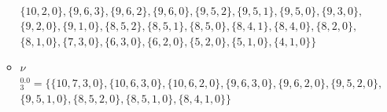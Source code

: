 \documentclass[12pt, a4paper, twoside]{book}
\numberwithin{equation}{section}
\theoremstyle{definition}
\newenvironment{ejem}
  {\pushQED{\qed}\renewcommand{\qedsymbol}{$\blacktriangleleft$}\ejemplo}
  {\popQED\endejemplo}
\theoremstyle{remark}
\theoremstyle{plain}
\begin{document}
\begin{ejem}
\begin{itemize}
\begin{itemize}
						\\$\{10, 2, 0\},\{9, 6, 3\},\{9, 6, 2\},\{9, 6, 0\},\{9, 5, 2\},\{9, 5, 1\},\{9, 5, 0\},\{9, 3, 0\},$
					\\$\{9, 2, 0\},\{9, 1, 0\},\{8, 5, 2\},\{8, 5, 1\},\{8, 5, 0\},\{8, 4, 1\},\{8, 4, 0\},\{8, 2, 0\},$
				\\$\{8, 1, 0\},\{7, 3, 0\},\{6, 3, 0\},\{6, 2, 0\},\{5, 2, 0\},\{5, 1, 0\},\{4, 1, 0\}\}$
					\item {\Large $\nu$}$^{0.0}_{3}=\{\{10, 7, 3, 0\},\{10, 6, 3, 0\},\{10, 6, 2, 0\},\{9, 6, 3, 0\},\{9, 6, 2, 0\},\{9, 5, 2, 0\},$
						\\$\{9, 5, 1, 0\},\{8, 5, 2, 0\},\{8, 5, 1, 0\},\{8, 4, 1, 0\}\}$
				\end{itemize}
		\end{itemize}


\end{ejem}
\end{document}
